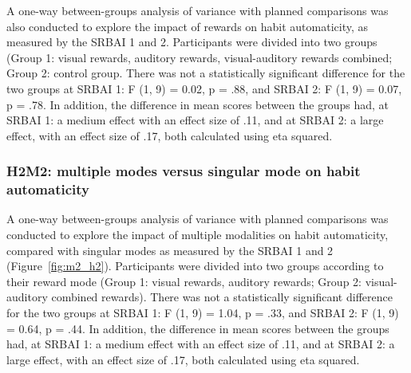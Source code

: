 A one-way between-groups analysis of variance with planned comparisons was also conducted to explore the impact of rewards on habit automaticity, as measured by the SRBAI 1 and 2. Participants were divided into two groups (Group 1: visual rewards, auditory rewards, visual-auditory rewards combined; Group 2: control group. There was not a
statistically significant difference for the two groups at SRBAI 1: F (1, 9) = 0.02, p = .88, and SRBAI 2: F (1, 9) = 0.07, p = .78. In addition, the difference in mean scores between the groups had, at SRBAI 1: a medium effect with an effect size of .11, and at SRBAI 2: a large effect, with an effect size of .17, both calculated using eta squared.

\subsubsection*{H2M2: multiple modes versus singular mode on habit automaticity}
A one-way between-groups analysis of variance with planned comparisons was conducted to explore the
impact of multiple modalities on habit automaticity, compared with singular modes as measured by the SRBAI 1 and 2 (Figure~\ref{fig:m2_h2}). Participants were divided into two groups according to their reward mode (Group 1: visual rewards, auditory rewards; Group 2: visual-auditory combined rewards). There was not a
statistically significant difference for the two groups at SRBAI 1: F (1, 9) = 1.04, p = .33, and SRBAI 2: F (1, 9) = 0.64, p = .44. In addition, the difference in mean scores between the groups had, at SRBAI 1: a medium effect with an effect size of .11, and at SRBAI 2: a large effect, with an effect size of .17, both calculated using eta squared.


